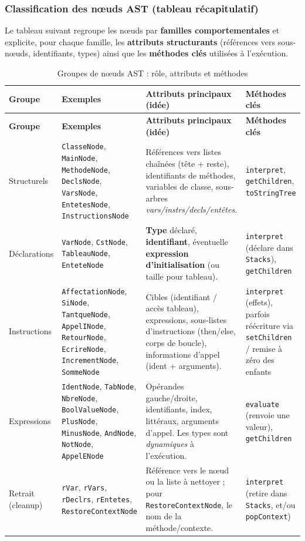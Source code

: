 \subsubsection{Classification des nœuds AST (tableau récapitulatif)}

Le tableau suivant regroupe les nœuds par \textbf{familles comportementales} et explicite, pour chaque famille, les \textbf{attributs structurants} (références vers sous-nœuds, identifiants, types) ainsi que les \textbf{méthodes clés} utilisées à l'exécution.

\begin{longtable}{|p{2.8cm}|p{3.4cm}|p{6.4cm}|p{3.0cm}|}
\caption{Groupes de nœuds AST : rôle, attributs et méthodes}\label{tab:groupes-nodes}\\
\hline
    \textbf{Groupe} & \textbf{Exemples} & \textbf{Attributs principaux (idée)} & \textbf{Méthodes clés} \\
\hline
\endfirsthead
\hline
    \textbf{Groupe} & \textbf{Exemples} & \textbf{Attributs principaux (idée)} & \textbf{Méthodes clés} \\
\hline
\endhead
Structurels & \texttt{ClasseNode}, \texttt{MainNode}, \texttt{MethodeNode}, \texttt{DeclsNode}, \texttt{VarsNode}, \texttt{EntetesNode}, \texttt{InstructionsNode} &
Références vers listes chaînées (tête + reste), identifiants de méthodes, variables de classe, sous-arbres \emph{vars/instrs/decls/entêtes}. &
    \texttt{interpret}, \texttt{getChildren}, \texttt{toStringTree} \\
\hline
Déclarations & \texttt{VarNode}, \texttt{CstNode}, \texttt{TableauNode}, \texttt{EnteteNode} &
    \textbf{Type} déclaré, \textbf{identifiant}, éventuelle \textbf{expression d'initialisation} (ou taille pour tableau). &
    \texttt{interpret} (déclare dans \texttt{Stacks}), \texttt{getChildren} \\
\hline
Instructions & \texttt{AffectationNode}, \texttt{SiNode}, \texttt{TantqueNode}, \texttt{AppelINode}, \texttt{RetourNode}, \texttt{EcrireNode}, \texttt{IncrementNode}, \texttt{SommeNode} &
Cibles (identifiant / accès tableau), expressions, sous-listes d'instructions (then/else, corps de boucle), informations d'appel (ident + arguments). &
    \texttt{interpret} (effets), parfois réécriture via \texttt{setChildren} / remise à zéro des enfants \\
\hline
Expressions & \texttt{IdentNode}, \texttt{TabNode}, \texttt{NbreNode}, \texttt{BoolValueNode}, \texttt{PlusNode}, \texttt{MinusNode}, \texttt{AndNode}, \texttt{NotNode}, \texttt{AppelENode} &
Opérandes gauche/droite, identifiants, index, littéraux, arguments d'appel. Les types sont \emph{dynamiques} à l'exécution. &
    \texttt{evaluate} (renvoie une valeur), \texttt{getChildren} \\
\hline
Retrait (cleanup) & \texttt{rVar}, \texttt{rVars}, \texttt{rDeclrs}, \texttt{rEntetes}, \texttt{RestoreContextNode} &
Référence vers le nœud ou la liste à nettoyer ; pour \texttt{RestoreContextNode}, le nom de la méthode/contexte. &
    \texttt{interpret} (retire dans \texttt{Stacks}, et/ou \texttt{popContext}) \\
\hline
\end{longtable}

